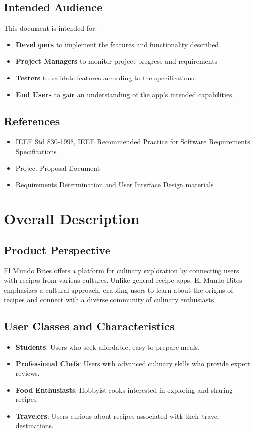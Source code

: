 \documentclass[12pt]{article}
\begin{document}
\subsection{Intended Audience}
This document is intended for:
\begin{itemize}
    \item \textbf{Developers} to implement the features and functionality described.
    \item \textbf{Project Managers} to monitor project progress and requirements.
    \item \textbf{Testers} to validate features according to the specifications.
    \item \textbf{End Users} to gain an understanding of the app’s intended capabilities.
\end{itemize}

\subsection{References}
\begin{itemize}
    \item IEEE Std 830-1998, IEEE Recommended Practice for Software Requirements Specifications
    \item Project Proposal Document
    \item Requirements Determination and User Interface Design materials
\end{itemize}

\newpage
\section{Overall Description}

\subsection{Product Perspective}
El Mundo Bites offers a platform for culinary exploration by connecting users with recipes from various cultures. Unlike general recipe apps, El Mundo Bites emphasizes a cultural approach, enabling users to learn about the origins of recipes and connect with a diverse community of culinary enthusiasts.

\subsection{User Classes and Characteristics}
\begin{itemize}
    \item \textbf{Students}: Users who seek affordable, easy-to-prepare meals.
    \item \textbf{Professional Chefs}: Users with advanced culinary skills who provide expert reviews.
    \item \textbf{Food Enthusiasts}: Hobbyist cooks interested in exploring and sharing recipes.
    \item \textbf{Travelers}: Users curious about recipes associated with their travel destinations.
\end{itemize}
\end{document}
